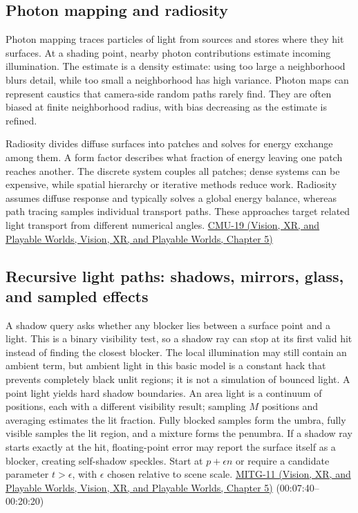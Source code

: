 \subsection{Photon mapping and radiosity}\label{03-visual-computing-i-ch011-photon-mapping-and-radiosity}

Photon mapping traces particles of light from sources and stores where they hit surfaces. At a shading point, nearby photon contributions estimate incoming illumination. The estimate is a density estimate: using too large a neighborhood blurs detail, while too small a neighborhood has high variance. Photon maps can represent caustics that camera-side random paths rarely find. They are often biased at finite neighborhood radius, with bias decreasing as the estimate is refined.

Radiosity divides diffuse surfaces into patches and solves for energy exchange among them. A form factor describes what fraction of energy leaving one patch reaches another. The discrete system couples all patches; dense systems can be expensive, while spatial hierarchy or iterative methods reduce work. Radiosity assumes diffuse response and typically solves a global energy balance, whereas path tracing samples individual transport paths. These approaches target related light transport from different numerical angles. \href{../07-Vision-XR-and-Playable-Worlds/main.pdf\#nameddest=04-visual-computing-ii-ch036-cmu-19---variance-reduction}{CMU-19 (Vision, XR, and Playable Worlds, Vision, XR, and Playable Worlds, Chapter 5)}

\subsection{Recursive light paths: shadows, mirrors, glass, and sampled effects}\label{03-visual-computing-i-ch011-recursive-light-paths-shadows-mirrors-glass-and-sampled-effects}

A shadow query asks whether any blocker lies between a surface point and a light. This is a binary visibility test, so a shadow ray can stop at its first valid hit instead of finding the closest blocker. The local illumination may still contain an ambient term, but ambient light in this basic model is a constant hack that prevents completely black unlit regions; it is not a simulation of bounced light. A point light yields hard shadow boundaries. An area light is a continuum of positions, each with a different visibility result; sampling \(M\) positions and averaging estimates the lit fraction. Fully blocked samples form the umbra, fully visible samples the lit region, and a mixture forms the penumbra. If a shadow ray starts exactly at the hit, floating-point error may report the surface itself as a blocker, creating self-shadow speckles. Start at \(p+\epsilon n\) or require a candidate parameter \(t>\epsilon\), with \(\epsilon\) chosen relative to scene scale. \href{../07-Vision-XR-and-Playable-Worlds/main.pdf\#nameddest=04-visual-computing-ii-ch036-mitg-11---ray-tracing}{MITG-11 (Vision, XR, and Playable Worlds, Vision, XR, and Playable Worlds, Chapter 5)} (00:07:40--00:20:20)

